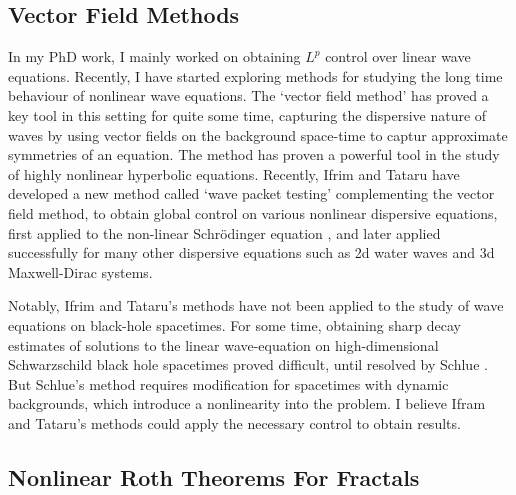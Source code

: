 \documentclass[11pt]{article}
\theoremstyle{definition}
\begin{document}
\subsection*{Vector Field Methods}

In my PhD work, I mainly worked on obtaining $L^p$ control over linear wave equations. Recently, I have started exploring methods for studying the long time behaviour of nonlinear wave equations. The `vector field method' has proved a key tool in this setting for quite some time, capturing the dispersive nature of waves by using vector fields on the background space-time to captur approximate symmetries of an equation. The method has proven a powerful tool in the study of highly nonlinear hyperbolic equations. Recently, Ifrim and Tataru \cite{IfrimTataruWaterWaves} have developed a new method called `wave packet testing' complementing the vector field method, to obtain global control on various nonlinear dispersive equations, first applied to the non-linear Schr\"{o}dinger equation \cite{IfrimTataruNLS}, and later applied successfully for many other dispersive equations such as 2d water waves and 3d Maxwell-Dirac systems.

Notably, Ifrim and Tataru's methods have not been applied to the study of wave equations on black-hole spacetimes. For some time, obtaining sharp decay estimates of solutions to the linear wave-equation on high-dimensional Schwarzschild black hole spacetimes proved difficult, until resolved by Schlue \cite{Schlue}. But Schlue's method requires modification for spacetimes with dynamic backgrounds, which introduce a nonlinearity into the problem. I believe Ifram and Tataru's methods could apply the necessary control to obtain results.

\subsection*{Nonlinear Roth Theorems For Fractals}
\end{document}
